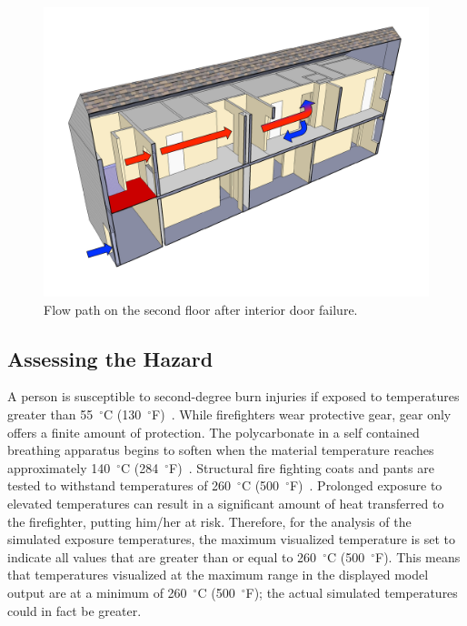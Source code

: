 \documentclass[12pt,oneside]{book}
\begin{document}
\begin{figure}[!ht]
\centering
\includegraphics[width=.7\textwidth]{../Figures/ChicagoFlow}
\caption{Flow path on the second floor after interior door failure.}
\label{fig:flowpath_1}
\end{figure}

\subsection{Assessing the Hazard}

A person is susceptible to second-degree burn injuries if exposed to temperatures greater than 55~$^{\circ}$C (130~$^{\circ}$F)~\cite{contactburn}. While firefighters wear protective gear, gear only offers a finite amount of protection. The polycarbonate in a self contained breathing apparatus begins to soften when the material temperature reaches approximately 140~$^{\circ}$C (284~$^{\circ}$F)~\cite{mensch2011emergency}. Structural fire fighting coats and pants are tested to withstand temperatures of 260~$^{\circ}$C (500~$^{\circ}$F)~\cite{nfpa2013standard}. Prolonged exposure to elevated temperatures can result in a significant amount of heat transferred to the firefighter, putting him/her at risk. Therefore, for the analysis of the simulated exposure temperatures, the maximum visualized temperature is set to indicate all values that are greater than or equal to 260~$^{\circ}$C (500~$^{\circ}$F). This means that temperatures visualized at the maximum range in the displayed model output are at a minimum of 260~$^{\circ}$C (500~$^{\circ}$F); the actual simulated temperatures could in fact be greater.
\end{document}
